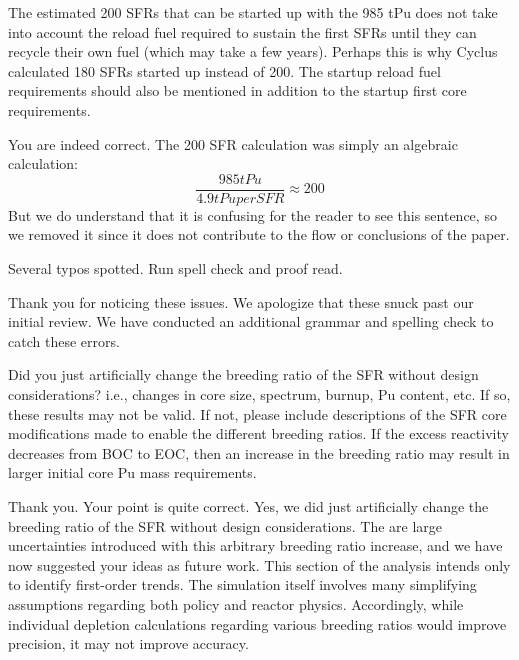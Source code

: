 \documentclass[answers,11pt]{exam}
\begin{document}
\begin{questions}
        \question The estimated 200 SFRs that can be started up with the 985 
        tPu does not take into account the reload fuel required to sustain the 
        first SFRs until they can recycle their own fuel (which may take a few 
        years). Perhaps this is why Cyclus calculated 180 SFRs started up 
        instead of 200. The startup reload fuel requirements should also be 
        mentioned in addition to the startup first core requirements.
        \begin{solution}
                You are indeed correct. The 200 SFR calculation was
                simply an algebraic calculation:
                \[ \frac{985 tPu}{4.9 tPu per SFR} \approx 200 \]
                But we do understand that it is confusing for the reader
                to see this sentence, so we removed it since it does not
                contribute to the flow or conclusions of the paper.
        \end{solution}

        \question Several typos spotted. Run spell check and proof read.

        \begin{solution}
                Thank you for noticing these issues. We apologize that these 
                snuck past our initial review. We have conducted an additional
                grammar and spelling check to catch these errors.
        \end{solution}

        \question Did you just artificially change the breeding ratio of the 
        SFR without design considerations?  i.e., changes in core size, 
        spectrum, burnup, Pu content, etc. If so, these results may not be 
        valid.  If not, please include descriptions of the SFR core 
        modifications made to enable the different breeding ratios. If the 
        excess reactivity decreases from BOC to EOC, then an increase in the 
        breeding ratio may result in larger initial core Pu mass requirements.
        \begin{solution}
                Thank you. Your point is quite correct. 
                Yes, we did just artificially change
                the breeding ratio of the SFR without design considerations.
                The are large uncertainties introduced with this arbitrary
                breeding ratio increase, and we have now suggested your
                ideas as future work. This section of the analysis intends
                only to identify first-order trends. The simulation itself
                involves many simplifying assumptions regarding both 
                policy and reactor physics. Accordingly, while individual 
                depletion calculations regarding various breeding ratios 
                would improve precision, it may not improve accuracy.
        \end{solution}


\end{questions}
\end{document}
